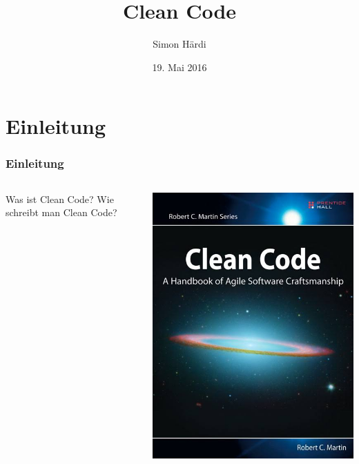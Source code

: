 \documentclass[handout]{beamer}
\title[CleanCode]{Clean Code}
\author{Simon Härdi}
\institute{Institute for Computational Engineering}
\date{19. Mai 2016}
\begin{document}
{
\begin{frame}
\maketitle
\end{frame}
}


\section{Einleitung}

\begin{frame}
\frametitle{Einleitung}
\begin{columns}
    \begin{column}{0.6\textwidth}
        \begin{outline}
            \1 Was ist Clean Code?
            \1[]
            \1 Wie schreibt man Clean Code?
        \end{outline}
    \end{column}
    \begin{column}{0.4\textwidth}
        \includegraphics[width=\linewidth]{cleanCodeBook.jpg}
    \end{column}
\end{columns}
\end{frame}
\end{document}
